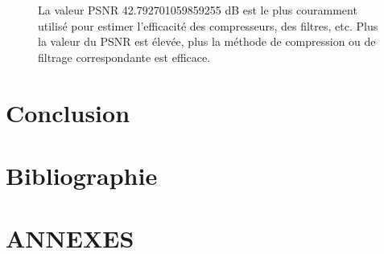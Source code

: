 \documentclass[12pt,a4paper]{report}
\numberwithin{equation}{subsection}
\numberwithin{equation}{section}
\begin{document}
\begin{figure}
\newline
\newline
La valeur PSNR 42.792701059859255 dB est le plus couramment utilisé pour estimer l'efficacité des compresseurs, des filtres, etc. Plus la valeur du PSNR est élevée, plus la méthode de compression ou de filtrage correspondante est efficace.
\end{figure}

\newpage
\section{Conclusion}
\newpage
\section{Bibliographie}
\newpage
\section{ANNEXES}
\end{document}
